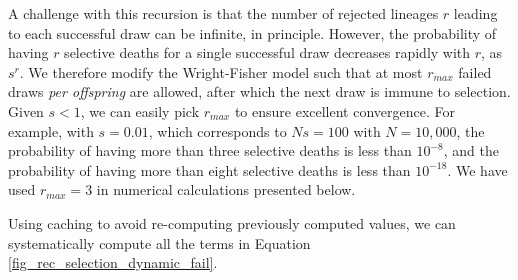\documentclass[review,nonatbib]{elsarticle}
\newcommand{\dslash}{/\!\!/}
\newcommand{\Coalc}[4]{\begin{bmatrix}#1\dslash #2 \\ #3\dslash #4 \end{bmatrix}}
\begin{document}


A challenge with this recursion is that the number of rejected lineages $r$ leading to each successful
draw can be infinite, in principle.
 However, the probability of having $r$ selective deaths for a single successful draw decreases
rapidly with $r$, as $s^r.$ We therefore modify the Wright-Fisher model such that at most $r_{max}$ failed
draws \emph{per offspring} are allowed, after which the next draw is immune to selection. Given
$s<1$, we can easily pick $r_{max}$ to ensure excellent convergence. For example, with $s=0.01$,
which corresponds to $Ns=100$ with $N=10,000$, the probability of having more than
three selective deaths is less than $10^{-8}$, and the probability of having more than eight selective deaths is
less than $10^{-18}.$ We have used $r_{max}=3$ in numerical calculations presented below.

Using caching to avoid re-computing previously computed values, we can systematically compute all the terms in Equation
\ref{fig_rec_selection_dynamic_fail}.
\end{document}
